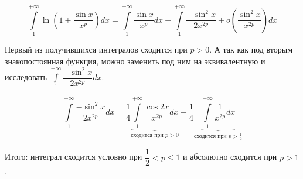 \documentclass[../main.tex]{subfiles}
\begin{document}
\[ \displaystyle\int\limits_{ 1}^{ + \infty } \ln \left( 1+ \dfrac{ \sin x}{ x^p}\right)dx= \displaystyle\int\limits_{ 1}^{ + \infty } \dfrac{ \sin x}{ x^p} dx+ \displaystyle\int\limits_{ 1}^{ + \infty } \dfrac{ -\sin^2 x}{ 2x^{2p}}+o \left( \dfrac{ \sin^2 x}{ x^{2p}}\right)dx\]

Первый из получившихся интегралов сходится при \( p > 0\). А так как под вторым знакопостоянная функция, можно заменить под ним на эквивалентную и исследовать \( \displaystyle\int\limits_{ 1}^{ + \infty } \dfrac{ -\sin^2 x}{ 2x^{2p}}dx\). 

\[ \displaystyle\int\limits_{ 1}^{ + \infty } \dfrac{ -\sin^2 x}{ 2x^{2p}}dx = \dfrac{ 1}{ 4} \underbrace{\displaystyle\int\limits_{ 1}^{ + \infty } \dfrac{ \cos2x}{ x^{2p}}dx}_{\text{сходится при } p>0}- \dfrac{ 1}{ 4} \underbrace{\displaystyle\int\limits_{ 1}^{ + \infty } \dfrac{ 1}{ x^{2p}}dx}_{\text{сходится при } p> \frac{ 1}{ 2} }\]

Итого: интеграл сходится условно при \( \dfrac{ 1}{ 2} < p \leq 1 \) и абсолютно сходится при \( p > 1\).
\end{document}
